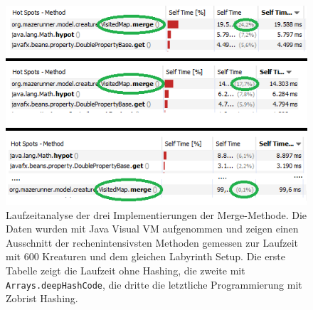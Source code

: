\begin{figure}[tb]
	\centering
	\includegraphics{images/benchmark.png}
	\caption{Laufzeitanalyse der drei Implementierungen der Merge-Methode. Die Daten wurden mit Java Visual VM aufgenommen und zeigen einen Ausschnitt der rechenintensivsten Methoden gemessen zur Laufzeit mit 600 Kreaturen und dem gleichen Labyrinth Setup. Die erste Tabelle zeigt die Laufzeit ohne Hashing, die zweite mit \lstinline{Arrays.deepHashCode}, die dritte die letztliche Programmierung mit Zobrist Hashing.}
	\label{fig:benchmark}
\end{figure}

